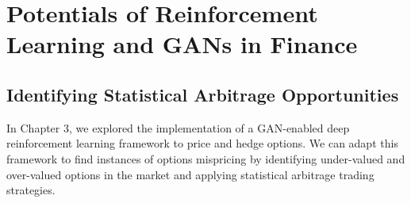 \chapter{Potentials of Reinforcement Learning and GANs in Finance}

\section{Identifying Statistical Arbitrage Opportunities}

In Chapter 3, we explored the implementation of a GAN-enabled deep reinforcement learning framework to price and hedge options. We can adapt this framework to find instances of options mispricing by identifying under-valued and over-valued options in the market and applying statistical arbitrage trading strategies.

